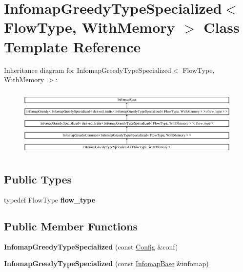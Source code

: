 \hypertarget{classInfomapGreedyTypeSpecialized_3_01FlowType_00_01WithMemory_01_4}{}\section{Infomap\+Greedy\+Type\+Specialized$<$ Flow\+Type, With\+Memory $>$ Class Template Reference}
\label{classInfomapGreedyTypeSpecialized_3_01FlowType_00_01WithMemory_01_4}
Inheritance diagram for Infomap\+Greedy\+Type\+Specialized$<$ Flow\+Type, With\+Memory $>$\+:\begin{figure}[H]
\begin{center}
\leavevmode
\includegraphics[height=3.486924cm]{classInfomapGreedyTypeSpecialized_3_01FlowType_00_01WithMemory_01_4}
\end{center}
\end{figure}
\subsection*{Public Types}
\begin{DoxyCompactItemize}
\item 
\mbox{\label{classInfomapGreedyTypeSpecialized_3_01FlowType_00_01WithMemory_01_4_a391c023fa6a6f20343e03c1da75ded0f}} 
typedef Flow\+Type {\bfseries flow\+\_\+type}
\end{DoxyCompactItemize}
\subsection*{Public Member Functions}
\begin{DoxyCompactItemize}
\item 
\mbox{\label{classInfomapGreedyTypeSpecialized_3_01FlowType_00_01WithMemory_01_4_acaff703219347cdecc57bd3269c3c140}} 
{\bfseries Infomap\+Greedy\+Type\+Specialized} (const \mbox{\hyperlink{structConfig}{Config}} \&conf)
\item 
\mbox{\label{classInfomapGreedyTypeSpecialized_3_01FlowType_00_01WithMemory_01_4_aed0a200f517849998ea7d81b33df8ebd}} 
{\bfseries Infomap\+Greedy\+Type\+Specialized} (const \mbox{\hyperlink{classInfomapBase}{Infomap\+Base}} \&infomap)
\end{DoxyCompactItemize}
